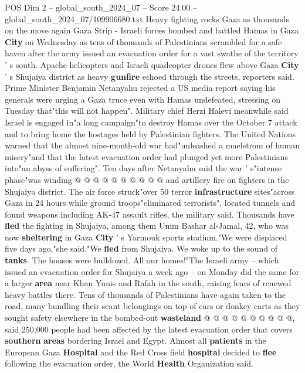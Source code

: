 \begin{textsample}{POS Dim 2 – global\_south\_2024\_07 – Score 24.00 – global\_south\_2024\_07/109906680.txt}  \label{ex:f2_pos_169}
Heavy fighting rocks Gaza as thousands on the move again Gaza Strip - Israeli forces bombed and battled Hamas in Gaza \textbf{City} on Wednesday as tens of thousands of Palestinians scrambled for a safe haven after the army issued an evacuation order for a vast swathe of the territory ' s south.
Apache helicopters and Israeli quadcopter drones flew above Gaza \textbf{City} ' s Shujaiya district as heavy \textbf{gunfire} echoed through the streets, reporters said.
Prime Minister Benjamin Netanyahu rejected a US media report saying his generals were urging a Gaza truce even with Hamas undefeated, stressing on Tuesday that"this will not happen".
Military chief Herzi Halevi meanwhile said Israel is engaged in"a long campaign"to destroy Hamas over the October 7 attack and to bring home the hostages held by Palestinian fighters.
The United Nations warned that the almost nine-month-old war had"unleashed a maelstrom of human misery"and that the latest evacuation order had plunged yet more Palestinians into"an abyss of suffering".
Ten days after Netanyahu said the war ' s"intense phase"was winding @ @ @ @ @ @ @ @ @ @ and artillery fire on fighters in the Shujaiya district.
The air force struck"over 50 terror \textbf{infrastructure} sites"across Gaza in 24 hours while ground troops"eliminated terrorists", located tunnels and found weapons including AK-47 assault rifles, the military said.
Thousands have \textbf{fled} the fighting in Shujaiya, among them Umm Bashar al-Jamal, 42, who was now \textbf{sheltering} in Gaza \textbf{City} ' s Yarmouk sports stadium."We were displaced five days ago,"she said."We \textbf{fled} from Shujaiya.
We woke up to the sound of \textbf{tanks}.
The houses were bulldozed.
All our homes!"The Israeli army -- which issued an evacuation order for Shujaiya a week ago -- on Monday did the same for a larger \textbf{area} near Khan Yunis and Rafah in the south, raising fears of renewed heavy battles there.
Tens of thousands of Palestinians have again taken to the road, many bundling their scant belongings on top of cars or donkey carts as they sought safety elsewhere in the bombed-out \textbf{wasteland} @ @ @ @ @ @ @ @ @ @, said 250,000 people had been affected by the latest evacuation order that covers \textbf{southern} \textbf{areas} bordering Israel and Egypt.
Almost all \textbf{patients} in the European Gaza \textbf{Hospital} and the Red Cross field \textbf{hospital} decided to \textbf{flee} following the evacuation order, the World \textbf{Health} Organization said.

\end{textsample}
